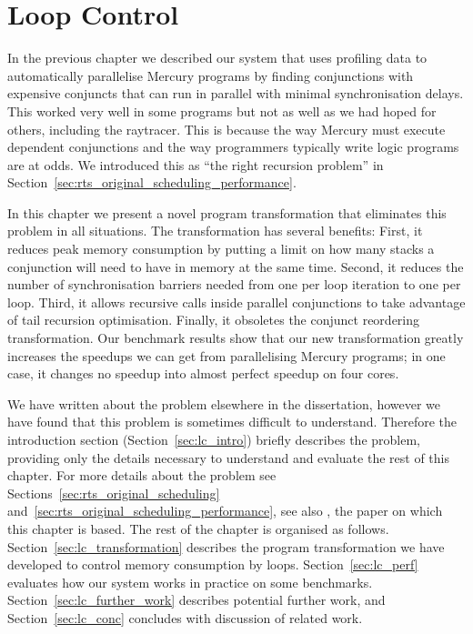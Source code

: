 
\chapter{Loop Control}
\label{chap:lc}
\label{chap:loop_control}


In the previous chapter we described our
system that uses profiling data
to automatically parallelise Mercury programs by
finding conjunctions with expensive conjuncts
that can run in parallel with minimal synchronisation delays.
This worked very well in some programs but not as well as we had hoped for
others,
including the raytracer.
This is because the way Mercury must execute dependent conjunctions
and the way programmers typically write logic programs are at odds.
We introduced this as
``the right recursion problem''
in Section~\ref{sec:rts_original_scheduling_performance}.

In this chapter we present a novel program transformation that eliminates
this problem in all situations.
The transformation has several benefits:
First, it reduces peak memory consumption
by putting a limit on how many stacks
a conjunction will need to have in memory at the same time.
Second,
it reduces the number of synchronisation barriers needed
from one per loop iteration to one per loop.
Third, it allows recursive calls inside parallel conjunctions to take
advantage of tail recursion optimisation.
Finally, it obsoletes the conjunct reordering transformation.
Our benchmark results show that our new transformation
greatly increases the speedups we can get from parallelising Mercury
programs;
in one case, it changes no speedup into almost perfect speedup on four cores.

We have written about the problem elsewhere in the dissertation,
however we have found that this problem is sometimes difficult to
understand.
Therefore
the introduction section
(Section~\ref{sec:lc_intro})
briefly describes the problem,
providing only the details necessary to understand and evaluate the rest of
this chapter.
For more details about the problem see
Sections~\ref{sec:rts_original_scheduling}
and~\ref{sec:rts_original_scheduling_performance},
see also \citet{bone:2012:loop_control}, the paper on which this chapter is
based.
The rest of the chapter is organised as follows.
Section~\ref{sec:lc_transformation} describes
the program transformation we have developed
to control memory consumption by loops.
Section~\ref{sec:lc_perf} evaluates
how our system works in practice on some benchmarks.
Section~\ref{sec:lc_further_work}
describes potential further work,
and
Section~\ref{sec:lc_conc} concludes with discussion of related work.

